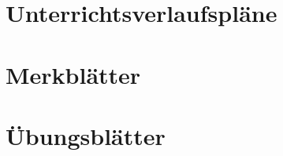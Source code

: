 \begin{appendices}
\section{Unterrichtsverlaufspläne}
\label{app:unterrichtsverlaufspläne}


\label{pdf:UVP1}
\pagebreak


\label{pdf:UVP2}
\pagebreak


\section{Merkblätter}
\label{app:merkblätter}
\pagebreak


\label{pdf:Merkblatt_Variablen_if}
\pagebreak


\label{pdf:Merkblatt_if_Listen}
\pagebreak


\label{pdf:Merkblatt_Funktionen}


\section{Übungsblätter}
\label{app:übungsblätter}
\pagebreak


\label{pdf:AB_HTML_CSS}
\pagebreak


\label{pdf:AB_HTML}
\pagebreak


\label{pdf:AB_Variablen_if}
\pagebreak


\end{appendices}

